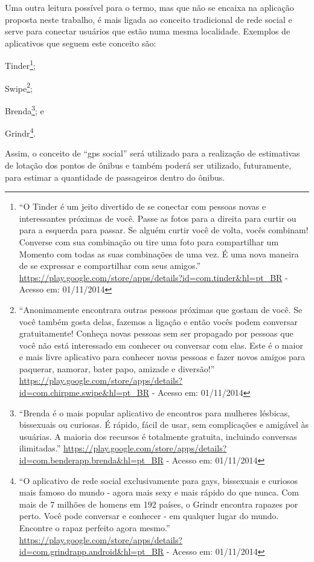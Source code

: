 Uma outra leitura possível para o termo, mas que não se encaixa na aplicação proposta neste trabalho, é mais ligada ao conceito tradicional de rede social e serve para conectar usuários que estão numa mesma localidade. Exemplos de aplicativos que seguem este conceito são:%
\begin{enumerate*}[label=\itshape\alph*\upshape)]
    \item Tinder\footnote{``O Tinder é um jeito divertido de se conectar com pessoas novas e interessantes próximas de você. Passe as fotos para a direita para curtir ou para a esquerda para passar. Se alguém curtir você de volta, vocês combinam! Converse com sua combinação ou tire uma foto para compartilhar um Momento com todas as suas combinações de uma vez. É uma nova maneira de se expressar e compartilhar com seus amigos.'' {\url{https://play.google.com/store/apps/details?id=com.tinder&hl=pt_BR}} - Acesso em: 01/11/2014};
%
    \item Swipe\footnote{``Anonimamente encontrara outras pessoas próximas que gostam de você. Se você também gosta delas, fazemos a ligação e então vocês podem conversar gratuitamente! Conheça novas pessoas sem ser propagado por pessoas que você não está interessado em conhecer ou conversar com elas. Este é o maior e mais livre aplicativo para conhecer novas pessoas e fazer novos amigos para paquerar, namorar, bater papo, amizade e diversão!'' {\url{https://play.google.com/store/apps/details?id=com.chirpme.swipe&hl=pt_BR}} - Acesso em: 01/11/2014};
%
    \item Brenda\footnote{``Brenda é o mais popular aplicativo de encontros para mulheres lésbicas, bissexuais ou curiosas. É rápido, fácil de usar, sem complicações e amigável às usuárias. A maioria dos recursos é totalmente gratuita, incluindo conversas ilimitadas.'' {\url{https://play.google.com/store/apps/details?id=com.benderapp.brenda&hl=pt_BR}} - Acesso em: 01/11/2014}; e
%
    \item Grindr\footnote{``O aplicativo de rede social exclusivamente para gays, bissexuais e curiosos mais famoso do mundo - agora mais sexy e mais rápido do que nunca. Com mais de 7 milhões de homens em 192 países, o Grindr encontra rapazes por perto. Você pode conversar e conhecer - em qualquer lugar do mundo. Encontre o rapaz perfeito agora mesmo.'' {\url{https://play.google.com/store/apps/details?id=com.grindrapp.android&hl=pt_BR}} - Acesso em: 01/11/2014}.
%
\end{enumerate*}

Assim, o conceito de ``gps social'' será utilizado para a realização de estimativas de lotação dos pontos de ônibus e também poderá ser utilizado, futuramente, para estimar a quantidade de passageiros dentro do ônibus.

